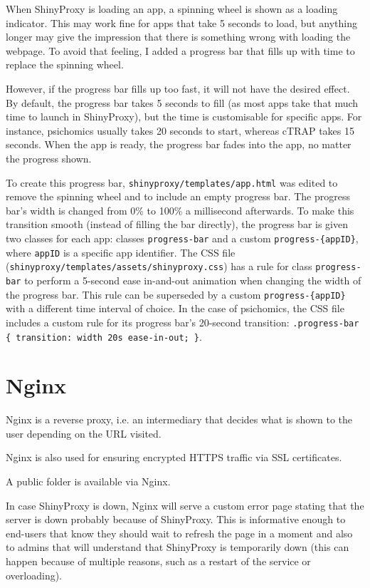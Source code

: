 When ShinyProxy is loading an app, a spinning wheel is shown as a loading indicator. This may work fine for apps that take 5 seconds to load, but anything longer may give the impression that there is something wrong with loading the webpage. To avoid that feeling, I added a progress bar that fills up with time to replace the spinning wheel.

However, if the progress bar fills up too fast, it will not have the desired effect. By default, the progress bar takes 5 seconds to fill (as most apps take that much time to launch in ShinyProxy), but the time is customisable for specific apps. For instance, psichomics usually takes 20 seconds to start, whereas cTRAP takes 15 seconds. When the app is ready, the progress bar fades into the app, no matter the progress shown.

To create this progress bar, \verb|shinyproxy/templates/app.html| was edited to remove the spinning wheel and to include an empty progress bar. The progress bar's width is changed from 0\% to 100\% a millisecond afterwards. To make this transition smooth (instead of filling the bar directly), the progress bar is given two classes for each app: classes \verb|progress-bar| and a custom \verb|progress-{appID}|, where \verb|appID| is a specific app identifier. The CSS file (\verb|shinyproxy/templates/assets/shinyproxy.css|) has a rule for class \verb|progress-bar| to perform a 5-second ease in-and-out animation when changing the width of the progress bar. This rule can be superseded by a custom \verb|progress-{appID}| with a different time interval of choice. In the case of psichomics, the CSS file includes a custom rule for its progress bar's 20-second transition: \verb|.progress-bar { transition: width 20s ease-in-out; }|.

\section{Nginx}

Nginx is a reverse proxy, i.e. an intermediary that decides what is shown to the user depending on the URL visited.


Nginx is also used for ensuring encrypted HTTPS traffic via SSL certificates.

A public folder is available via Nginx.

In case ShinyProxy is down, Nginx will serve a custom error page stating that the server is down probably because of ShinyProxy. This is informative enough to end-users that know they should wait to refresh the page in a moment and also to admins that will understand that ShinyProxy is temporarily down (this can happen because of multiple reasons, such as a restart of the service or overloading).

